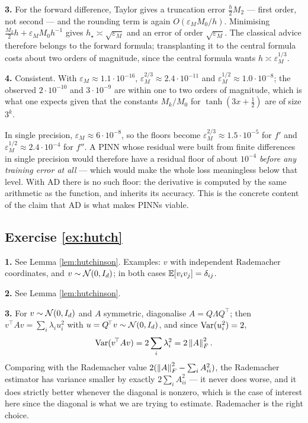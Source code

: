 \documentclass[11pt,a4paper]{article}
\begin{document}
\textbf{3.} For the forward difference, Taylor gives a truncation error $\tfrac{h}{2}M_2$ --- first
order, not second --- and the rounding term is again $O(\varepsilon_{\!M}M_0/h)$. Minimising
$\tfrac{M_2}{2}h + \varepsilon_{\!M}M_0h^{-1}$ gives $h_\star \asymp \sqrt{\varepsilon_{\!M}}$ and an
error of order $\sqrt{\varepsilon_{\!M}}$. The classical advice therefore belongs to the forward
formula; transplanting it to the central formula costs about two orders of magnitude, since the
central formula wants $h \asymp \varepsilon_{\!M}^{1/3}$.

\textbf{4.} Consistent. With $\varepsilon_{\!M} \approx 1.1\cdot10^{-16}$,
$\varepsilon_{\!M}^{2/3} \approx 2.4\cdot 10^{-11}$ and $\varepsilon_{\!M}^{1/2}\approx 1.0\cdot10^{-8}$;
the observed $2\cdot10^{-10}$ and $3\cdot10^{-9}$ are within one to two orders of magnitude, which is
what one expects given that the constants $M_k/M_0$ for $\tanh(3x+\tfrac12)$ are of size $3^k$.

In single precision, $\varepsilon_{\!M}\approx 6\cdot10^{-8}$, so the floors become
$\varepsilon_{\!M}^{2/3}\approx 1.5\cdot10^{-5}$ for $f'$ and
$\varepsilon_{\!M}^{1/2}\approx 2.4\cdot10^{-4}$ for $f''$. A PINN whose residual were built from
finite differences in single precision would therefore have a residual floor of about $10^{-4}$
\emph{before any training error at all} --- which would make the whole loss meaningless below that
level. With AD there is no such floor: the derivative is computed by the same arithmetic as the
function, and inherits its accuracy. This is the concrete content of the claim that AD is what makes
PINNs viable.

\subsection*{Exercise \ref{ex:hutch}}

\textbf{1.} See Lemma \ref{lem:hutchinson}. Examples: $v$ with independent Rademacher coordinates,
and $v \sim \mathcal{N}(0,I_d)$; in both cases $\mathbb{E}[v_iv_j] = \delta_{ij}$.

\textbf{2.} See Lemma \ref{lem:hutchinson}.

\textbf{3.} For $v\sim\mathcal{N}(0,I_d)$ and $A$ symmetric, diagonalise $A = Q\Lambda Q^{\!\top}$; then
$v^{\!\top}Av = \sum_i \lambda_i u_i^2$ with $u = Q^{\!\top}v \sim \mathcal{N}(0,I_d)$, and since
$\operatorname{Var}(u_i^2) = 2$,
\[
\operatorname{Var}(v^{\!\top}Av) = 2\sum_i\lambda_i^2 = 2\left\lVert A \right\rVert_F^2 .
\]
Comparing with the Rademacher value $2(\left\lVert A \right\rVert_F^2 - \sum_i A_{ii}^2)$, the Rademacher estimator has
variance smaller by exactly $2\sum_i A_{ii}^2$ --- it never does worse, and it does strictly better
whenever the diagonal is nonzero, which is the case of interest here since the diagonal is what we
are trying to estimate. Rademacher is the right choice.
\end{document}
